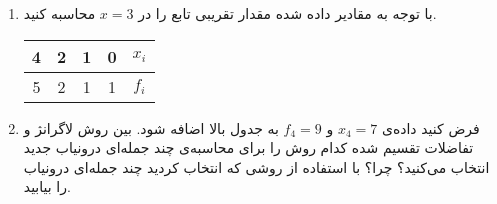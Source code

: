 \begin{enumerate}
\item

با توجه به مقادیر داده شده مقدار تقریبی تابع را در 
$x = 3$
محاسبه کنید.

	
	\begin{center}
		\begin{tabular}{c | c | c | c | c }
			4 & 2 & 1 & 0 & $x_i$ \\
			\hline
			5 & 2 & 1 & 1 & $f_i$ 
			
		\end{tabular}
\end{center}
	\item
	فرض کنید داده‌ی 
	$x_4 = 7$
	و 
	$f_4 = 9$
	به جدول بالا اضافه شود. بین روش لاگرانژ و تفاضلات تقسیم شده کدام روش را برای محاسبه‌ی چند جمله‌ای درونیاب جدید انتخاب می‌کنید؟ چرا؟ با استفاده از روشی که انتخاب کردید چند جمله‌ای درونیاب را بیابید.
\end{enumerate}

